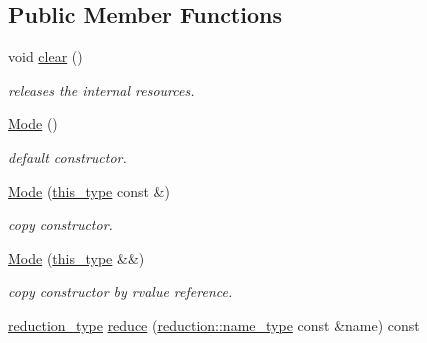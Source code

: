 \subsection*{Public Member Functions}
\begin{DoxyCompactItemize}
\item 
\hypertarget{classhryky_1_1file_1_1descriptor_1_1_mode_a56f17b65836a3add1b908e2df24b126f}{void \hyperlink{classhryky_1_1file_1_1descriptor_1_1_mode_a56f17b65836a3add1b908e2df24b126f}{clear} ()}\label{classhryky_1_1file_1_1descriptor_1_1_mode_a56f17b65836a3add1b908e2df24b126f}

\begin{DoxyCompactList}\small\item\em releases the internal resources. \end{DoxyCompactList}\item 
\hypertarget{classhryky_1_1file_1_1descriptor_1_1_mode_a86f797b62eb4fdd0cb39bd7f82a92ddf}{\hyperlink{classhryky_1_1file_1_1descriptor_1_1_mode_a86f797b62eb4fdd0cb39bd7f82a92ddf}{Mode} ()}\label{classhryky_1_1file_1_1descriptor_1_1_mode_a86f797b62eb4fdd0cb39bd7f82a92ddf}

\begin{DoxyCompactList}\small\item\em default constructor. \end{DoxyCompactList}\item 
\hypertarget{classhryky_1_1file_1_1descriptor_1_1_mode_aeb84f3569536d091a80fa887e3200770}{\hyperlink{classhryky_1_1file_1_1descriptor_1_1_mode_aeb84f3569536d091a80fa887e3200770}{Mode} (\hyperlink{classhryky_1_1file_1_1descriptor_1_1_mode_a06dd006ab194ebabae7e2b324246df44}{this\-\_\-type} const \&)}\label{classhryky_1_1file_1_1descriptor_1_1_mode_aeb84f3569536d091a80fa887e3200770}

\begin{DoxyCompactList}\small\item\em copy constructor. \end{DoxyCompactList}\item 
\hypertarget{classhryky_1_1file_1_1descriptor_1_1_mode_ade3cd014356f32e39ec207082817055d}{\hyperlink{classhryky_1_1file_1_1descriptor_1_1_mode_ade3cd014356f32e39ec207082817055d}{Mode} (\hyperlink{classhryky_1_1file_1_1descriptor_1_1_mode_a06dd006ab194ebabae7e2b324246df44}{this\-\_\-type} \&\&)}\label{classhryky_1_1file_1_1descriptor_1_1_mode_ade3cd014356f32e39ec207082817055d}

\begin{DoxyCompactList}\small\item\em copy constructor by rvalue reference. \end{DoxyCompactList}\item 
\hypertarget{classhryky_1_1file_1_1descriptor_1_1_mode_afa930c7576622d0def066d6ce3b0894f}{\hyperlink{namespacehryky_a343a9a4c36a586be5c2693156200eadc}{reduction\-\_\-type} \hyperlink{classhryky_1_1file_1_1descriptor_1_1_mode_afa930c7576622d0def066d6ce3b0894f}{reduce} (\hyperlink{namespacehryky_1_1reduction_ac686c30a4c8d196bbd0f05629a6b921f}{reduction\-::name\-\_\-type} const \&name) const }\label{classhryky_1_1file_1_1descriptor_1_1_mode_afa930c7576622d0def066d6ce3b0894f}


\end{DoxyCompactItemize}
